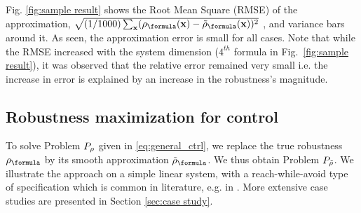 Fig. \ref{fig:sample result} shows the Root Mean Square (RMSE) of the approximation, $\sqrt{(1/1000)\sum_{\sstraj}(\robf(\sstraj)-\srobf(\sstraj))^2}$
, and variance bars around it. 
As seen, the approximation error is small for all cases.
Note that while the RMSE  increased with the system dimension ($4^{th}$ formula in Fig.~\ref{fig:sample result}), it was observed that the relative error remained very small i.e. the increase in error is explained by an increase in the robustness's magnitude. 





\subsection{Robustness maximization for control}
\label{sec:toy example}
To solve Problem $P_\rho$ given in \eqref{eq:general_ctrl}, we replace the true robustness $\robf$ by its smooth approximation $\srobf$.
We thus obtain Problem $P_{\tilde{\rho}}$.
We illustrate the approach on a simple linear system, with a reach-while-avoid type of specification which is common in literature, e.g. in \cite{Saha_acc16}. More extensive case studies are presented in Section \ref{sec:case study}.

